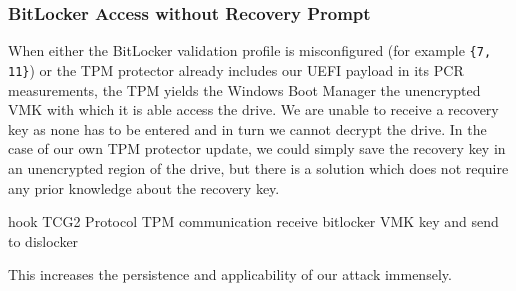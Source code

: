 \subsubsection{BitLocker Access without Recovery Prompt}
\label{sec:attacks:bitlocker:bitlocker-access-without-recovery-prompt}

When either the BitLocker validation profile is misconfigured (for example \lstinline|{7, 11}|) or the \ac{TPM} protector already includes our \ac{UEFI} payload in its \ac{PCR} measurements, the \ac{TPM} yields the Windows Boot Manager the unencrypted \ac{VMK} with which it is able access the drive.
We are unable to receive a recovery key as none has to be entered and in turn we cannot decrypt the drive.
In the case of our own \ac{TPM} protector update, we could simply save the recovery key in an unencrypted region of the drive, but there is a solution which does not require any prior knowledge about the recovery key.

hook \ac{TCG}2 Protocol \cite[6.7.3]{tcg-efi-protocol-spec}
\ac{TPM} communication
receive bitlocker \ac{VMK} key and send to dislocker
\cite{bde-format-spec}
\cite{tpm-sniffing}

This increases the persistence and applicability of our attack immensely.